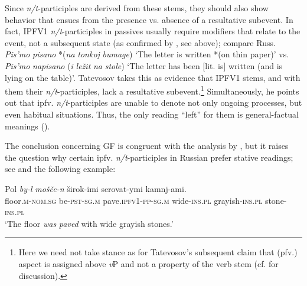 \documentclass[output=paper]{langscibook}
\begin{document}
Since \textit{n/t}-participles are derived from these stems, they should also show behavior that ensues from the presence vs. absence of a resultative subevent. In fact, IPFV1 \textit{n/t}-participles in passives usually require modifiers that relate to the event, not a subsequent state (as confirmed by \citealt{Borik.Gehrke2018}, see above); compare Russ.\textit{ Pis’mo} \textit{pisano} *(\textit{na} \textit{tonkoj} \textit{bumage}) ‘The letter is written *(on thin paper)’ vs. \textit{Pis’mo} \textit{napisano} (\textit{i} \textit{ležit} \textit{na} \textit{stole}) ‘The letter has been [lit. is] written (and is lying on the table)’. Tatevosov takes this as evidence that IPFV1 stems, and with them their \textit{n/t}-participles, lack a resultative subevent.\footnote{Here we need not take stance as for Tatevosov’s subsequent claim that (pfv.) aspect is assigned above \textit{v}P and not a property of the verb stem (cf. \citealt[107--110]{Wiemer2019} for discussion).} Simultaneously, he points out that ipfv. \textit{n/t}-participles are unable to denote not only ongoing processes, but even habitual situations. Thus, the only reading “left” for them is general-factual meanings (\citealt[291]{Tatevosov2015Akcional}).\largerpage[1.5]

\begin{sloppypar}
The conclusion concerning GF is congruent with the analysis by \citet{Borik.Gehrke2018}, but it raises the question why certain ipfv. \textit{n/t}-participles in Russian prefer stative readings; see  and the following example:
\end{sloppypar}

\ea\label{wiem:ex:pol}{\gll
{Pol} {\textit{by-l}} \textit{{mošče-n}} {širok-imi} {serovat-ymi} {kamnj-ami}.\\
floor.\textsc{m-nom.sg} be-\textsc{pst-sg.m} pave.\textsc{ipfv1-pp-sg.m} wide-\textsc{ins.pl} grayish-\textsc{ins.pl} stone-\textsc{ins.pl}\\
\glt ‘The floor \textit{was} \textit{paved} with wide grayish stones.’\hfill \citep[292]{Tatevosov2015Akcional}
}
\z
\end{document}
